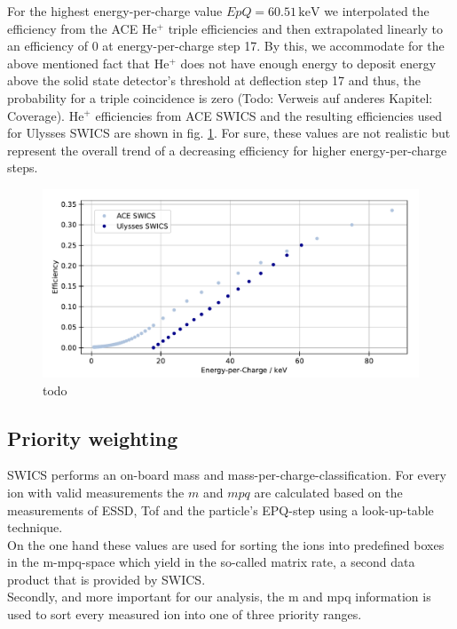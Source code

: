 For the highest energy-per-charge value $EpQ = 60.51\,\mathrm{keV}$ we interpolated the efficiency from the ACE $\mathrm{He^{+}}$ triple efficiencies and then extrapolated linearly to an efficiency of 0 at energy-per-charge step 17. By this, we accommodate for the above mentioned fact that $\mathrm{He^{+}}$ does not have enough energy to deposit energy above the solid state detector's threshold at deflection step 17 and thus, the probability for a triple coincidence is zero (Todo: Verweis auf anderes Kapitel: Coverage). $\mathrm{He^{+}}$ efficiencies from ACE SWICS and the resulting efficiencies used for Ulysses SWICS are shown in fig. \ref{fig:guess_eff}. For sure, these values are not realistic but represent the overall trend of a decreasing efficiency for higher energy-per-charge steps.
\begin{figure}[h]
	\includegraphics[width=1.\textwidth]{Figures/guess_eff.pdf}
	\centering
	\caption{todo}
	\label{fig:guess_eff}
\end{figure}


\subsection{Priority weighting}
SWICS performs an on-board mass and mass-per-charge-classification. For every ion with valid measurements the $m$ and $mpq$ are calculated based on the measurements of ESSD, Tof and the particle's EPQ-step using a look-up-table technique.\\
On the one hand these values are used for sorting the ions into predefined boxes in the m-mpq-space which yield in the so-called matrix rate, a second data product that is provided by SWICS.\\
Secondly, and more important for our analysis, the m and mpq information is used to sort every measured ion into one of three priority ranges.

